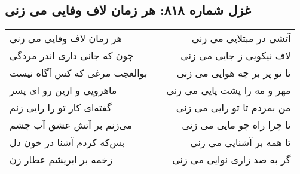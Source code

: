 \begin{center}
\section*{غزل شماره ۸۱۸: هر زمان لاف وفایی می زنی}
\label{sec:818}
\begin{longtable}{l p{0.5cm} r}
هر زمان لاف وفایی می زنی
&&
آتشی در مبتلایی می زنی
\\
چون که جانی داری اندر مردگی
&&
لاف نیکویی ز جایی می زنی
\\
بوالعجب مرغی که کس آگاه نیست
&&
تا تو پر بر چه هوایی می زنی
\\
ماهرویی و ازین رو ای پسر
&&
مهر و مه را پشت پایی می زنی
\\
گفته‌ای کار تو را رایی زنم
&&
من بمردم تا تو رایی می زنی
\\
می‌زنم بر آتش عشق آب چشم
&&
تا چرا راه چو مایی می زنی
\\
بس‌که کردم آشنا در خون دل
&&
تا همه بر آشنایی می زنی
\\
زخمه بر ابریشم عطار زن
&&
گر به صد زاری نوایی می زنی
\\
\end{longtable}
\end{center}
